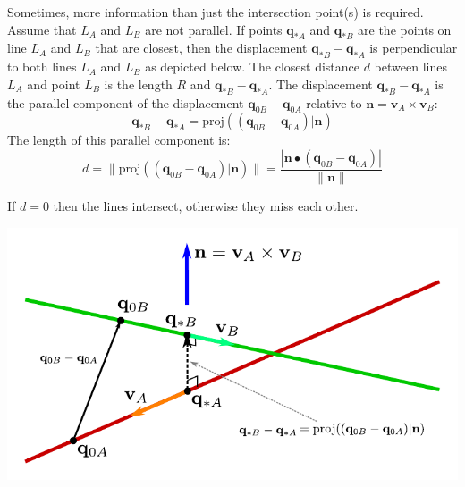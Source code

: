 \documentclass{article}
\begin{document}
\vspace{5mm}

Sometimes, more information than just the intersection point(s) is required. Assume that \(L_A\) and \(L_B\) are not parallel. If points \(\mathbf{q}_{*A}\) and \(\mathbf{q}_{*B}\) are the points on line \(L_A\) and \(L_B\) that are closest, then the displacement \(\mathbf{q}_{*B} - \mathbf{q}_{*A}\) is perpendicular to both lines \(L_A\) and \(L_B\) as depicted below. The closest distance \(d\) between lines \(L_A\) and point \(L_B\) is the length \(R\) and \(\mathbf{q}_{*B} - \mathbf{q}_{*A}\). 
The displacement \(\mathbf{q}_{*B} - \mathbf{q}_{*A}\) is the parallel component of the displacement \(\mathbf{q}_{0B} - \mathbf{q}_{0A}\) relative to \(\mathbf{n} = \mathbf{v}_A \times \mathbf{v}_B\):
\[\mathbf{q}_{*B} - \mathbf{q}_{*A} = \text{proj}((\mathbf{q}_{0B} - \mathbf{q}_{0A})|\mathbf{n})\]
The length of this parallel component is:
\[d = \|\text{proj}((\mathbf{q}_{0B} - \mathbf{q}_{0A})|\mathbf{n})\| = \frac{|\mathbf{n} \bullet (\mathbf{q}_{0B} - \mathbf{q}_{0A})|}{\|\mathbf{n}\|}\] 

If \(d = 0\) then the lines intersect, otherwise they miss each other. %

\includegraphics[width = \textwidth]{line_line_closest_distance}
\end{document}
